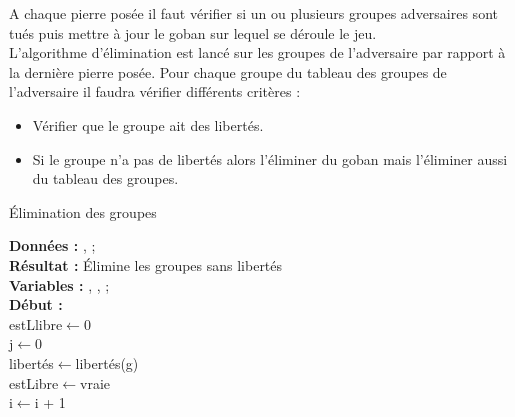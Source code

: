     
    A chaque pierre posée il faut vérifier si un ou plusieurs groupes adversaires sont tués puis mettre à jour le goban sur lequel se déroule le jeu.\\
    L'algorithme d'élimination est lancé sur les groupes de l'adversaire par rapport à la dernière pierre posée. Pour chaque groupe du tableau des groupes de l'adversaire il faudra vérifier différents critères :\\
    \begin{itemize}
    \item Vérifier que le groupe ait des libertés.
    \item Si le groupe n'a pas de libertés alors l'éliminer du goban mais l'éliminer aussi du tableau des groupes.
    \end{itemize}
    \begin{algorithme}
    \caption{Élimination des groupes}
    \textbf{Données :}
    ,
    ;\\
    \textbf{Résultat :} Élimine les groupes sans libertés\\
    \textbf{Variables :}   
    ,
    ,
    ;\\
    \textbf{Début :}\\
    {estLlibre$\leftarrow$0\\
    j$\leftarrow$0\\
    libertés$\leftarrow$libertés(g)\\
    {
    {estLibre$\leftarrow$vraie\\
    i$\leftarrow$i + 1}
    }
    }
    \end{algorithme}
    
